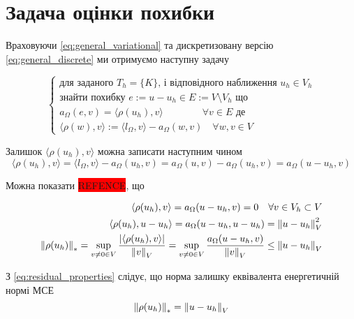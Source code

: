 
\section{Задача оцінки похибки}

Враховуючи
\eqref{eq:general_variational} та дискретизовану версію
\eqref{eq:general_discrete} ми отримуємо наступну задачу

\begin{equation}\label{eq:AE_problem}
	\begin{cases}
		\mbox{для заданого } T_h=\{K\} \text{, і відповідного наближення } u_h \in V_h \\
		\text{знайти похибку } e:=u-u_h \in E := V \setminus V_h \text{ що} \\
		a_\Omega(e,v) = \langle\rho(u_h), v\rangle \qquad \qquad \forall v \in E \text{ де}\\
		\langle\rho(w), v\rangle := \langle l_\Omega, v\rangle - a_\Omega(w, v) \quad \forall w,v \in V
	\end{cases}
\end{equation}

Залишок $\langle\rho(u_h), v\rangle$ можна записати наступним чином
\begin{equation*}
	\langle\rho(u_h), v\rangle
		= \langle l_\Omega, v\rangle - a_\Omega(u_h, v)
		= a_\Omega(u,v)-a_\Omega(u_h, v) = a_\Omega(u-u_h, v)
\end{equation*}

Можна показати \colorbox{red}{REFENCE}, що

\begin{equation}\label{eq:residual_properties}
	\begin{split}
		\langle\rho(u_h), v\rangle = a_\Omega(u-u_h, v) = 0 \quad \forall v \in V_h \subset V \\
		\langle\rho(u_h), u-u_h\rangle = a_\Omega(u-u_h, u-u_h) = \left\lVert u-u_h\right\rVert^2_V \\
		\left\lVert\rho(u_h)\right\rVert_* = \sup \limits_{v \ne 0 \in V} \frac{|\langle\rho(u_h), v\rangle|}{\left\lVert v\right\rVert_V} =
			\sup \limits_{v \ne 0 \in V} \frac{a_\Omega(u-u_h, v)}{\left\lVert v\right\rVert_V} \le \left\lVert u-u_h\right\rVert_V
	\end{split}
\end{equation}

З
\eqref{eq:residual_properties} слідує, що норма залишку еквівалента енергетичній нормі МСЕ
\begin{equation}
	\left\lVert\rho(u_h)\right\rVert_* = \left\lVert u-u_h\right\rVert_V
\end{equation}


